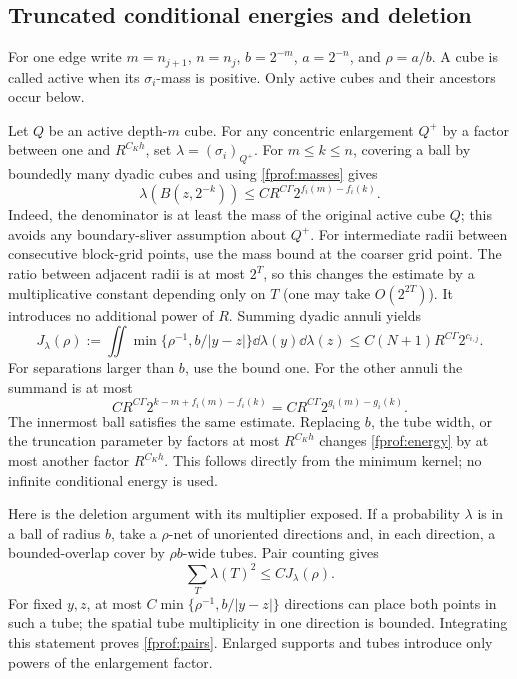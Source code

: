 \subsection{Truncated conditional energies and deletion}

For one edge write \(m=n_{j+1}\), \(n=n_j\), \(b=2^{-m}\), \(a=2^{-n}\), and \(\rho=a/b\). A cube is called active when its \(\sigma_i\)-mass is positive. Only active cubes and their ancestors occur below.

Let \(Q\) be an active depth-\(m\) cube. For any concentric enlargement \(Q^+\) by a factor between one and \(R^{C_Kh}\), set \(\lambda=(\sigma_i)_{Q^+}\). For \(m\leq k\leq n\), covering a ball by boundedly many dyadic cubes and using \eqref{fprof:masses} gives
$$
 \lambda(B(z,2^{-k}))\leq C R^{C\Gamma}2^{f_i(m)-f_i(k)}.
$$
Indeed, the denominator is at least the mass of the original active cube \(Q\); this avoids any boundary-sliver assumption about \(Q^+\). For intermediate radii between consecutive block-grid points, use the mass
bound at the coarser grid point. The ratio between adjacent radii is at most
\(2^T\), so this changes the estimate by a multiplicative constant depending
only on \(T\) (one may take \(O(2^{2T})\)). It introduces no additional power
of \(R\). Summing dyadic annuli yields
\begin{equation}\label{fprof:energy}
 J_\lambda(\rho):=\iint\min\{\rho^{-1},b/|y-z|\}\dd\lambda(y)\dd\lambda(z)
 \leq C(N+1)R^{C\Gamma}2^{c_{i,j}}.
\end{equation}
For separations larger than \(b\), use the bound one. For the other annuli the summand is at most
$$
 C R^{C\Gamma}2^{k-m+f_i(m)-f_i(k)}
 =C R^{C\Gamma}2^{g_i(m)-g_i(k)}.
$$
The innermost ball satisfies the same estimate. Replacing \(b\), the tube width, or the truncation parameter by factors at most \(R^{C_Kh}\) changes \eqref{fprof:energy} by at most another factor \(R^{C_Kh}\). This follows directly from the minimum kernel; no infinite conditional energy is used.

Here is the deletion argument with its multiplier exposed. If a probability \(\lambda\) is in a ball of radius \(b\), take a \(\rho\)-net of unoriented directions and, in each direction, a bounded-overlap cover by \(\rho b\)-wide tubes. Pair counting gives
\begin{equation}\label{fprof:pairs}
 \sum_T\lambda(T)^2\leq C J_\lambda(\rho).
\end{equation}
For fixed \(y,z\), at most
\(C\min\{\rho^{-1},b/|y-z|\}\) directions can place both points in such a tube; the spatial tube multiplicity in one direction is bounded. Integrating this statement proves \eqref{fprof:pairs}. Enlarged supports and tubes introduce only powers of the enlargement factor.

